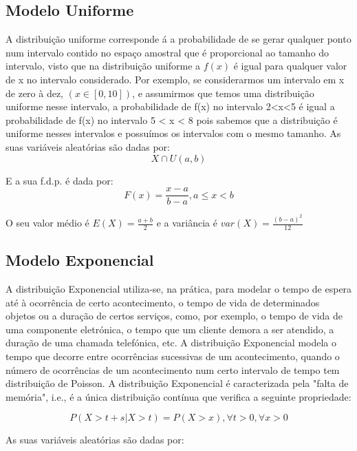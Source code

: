 \documentclass[10pt,a4paper]{report}
\begin{document}
\subsection{Modelo Uniforme}
A distribuiç\~ao uniforme corresponde á a probabilidade de se gerar qualquer ponto num intervalo contido no espaço amostral que é proporcional ao tamanho do intervalo, visto que na distribuição uniforme a $f(x)$ é igual para qualquer valor de x no intervalo considerado. Por exemplo, se considerarmos um intervalo em x de zero à dez, $(x \in [0,10])$, e assumirmos que temos uma distribuição uniforme nesse intervalo, a probabilidade de f(x) no intervalo  2<x<5 é igual a probabilidade de f(x) no intervalo  5 < x < 8 pois sabemos que a distribuição é uniforme nesses intervalos e possuímos os intervalos com o mesmo tamanho.
As suas variáveis aleatórias s\~ao dadas por:\\

$$
X \cap U(a, b)
$$

E a sua f.d.p. é dada por:\\

$$
F(x) = \frac{x-a}{b-a}, a \leq x < b
$$

\vspace{0.7cm}

O seu valor médio é $E(X)=\frac{a+b}{2}$ e a variância é $var(X)=\frac{(b-a)^2}{12}$

\subsection{Modelo Exponencial}

A distribuição Exponencial utiliza-se, na prática, para modelar
o tempo de espera até à ocorrência de certo acontecimento, o
tempo de vida de determinados objetos ou a duração de
certos serviços, como, por exemplo, o tempo de vida de uma
componente eletrónica, o tempo que um cliente demora a ser
atendido, a duração de uma chamada telefónica, etc.
A distribuição Exponencial modela o tempo que decorre entre
ocorrências sucessivas de um acontecimento, quando o número
de ocorrências de um acontecimento num certo intervalo de
tempo tem distribuição de Poisson.
A distribuição Exponencial é caracterizada pela "falta de
memória", i.e., é a única distribuição contínua que verifica a
seguinte propriedade:

$$P(X > t + s|X >t) = P(X > x), \forall t > 0, \forall x >0$$

As suas variáveis aleatórias s\~ao dadas por:\\
\end{document}
